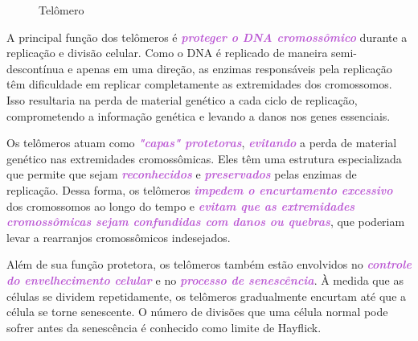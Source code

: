 \documentclass[11pt,a4paper]{article}
\begin{document}
    \begin{figure}[h]
        \centering
        \caption{Telômero}
        \label{fig:telomero}
    \end{figure}

    A principal função dos telômeros é \textcolor{MediumOrchid}{\textbf{\textit{proteger o DNA cromossômico}}} durante a replicação e divisão celular. Como o DNA é replicado de maneira semi-descontínua e apenas em uma direção, as enzimas responsáveis pela replicação têm dificuldade em replicar completamente as extremidades dos cromossomos. Isso resultaria na perda de material genético a cada ciclo de replicação, comprometendo a informação genética e levando a danos nos genes essenciais.

    Os telômeros atuam como \textcolor{MediumOrchid}{\textbf{\textit{"capas" protetoras}}}, \textcolor{MediumOrchid}{\textbf{\textit{evitando}}} a perda de material genético nas extremidades cromossômicas. Eles têm uma estrutura especializada que permite que sejam \textcolor{MediumOrchid}{\textbf{\textit{reconhecidos}}} e \textcolor{MediumOrchid}{\textbf{\textit{preservados}}} pelas enzimas de replicação. Dessa forma, os telômeros \textcolor{MediumOrchid}{\textbf{\textit{impedem o encurtamento excessivo}}} dos cromossomos ao longo do tempo e \textcolor{MediumOrchid}{\textbf{\textit{evitam que as extremidades cromossômicas sejam confundidas com danos ou quebras}}}, que poderiam levar a rearranjos cromossômicos indesejados.

    Além de sua função protetora, os telômeros também estão envolvidos no \textcolor{MediumOrchid}{\textbf{\textit{controle do envelhecimento celular}}} e no \textcolor{MediumOrchid}{\textbf{\textit{processo de senescência}}}. À medida que as células se dividem repetidamente, os telômeros gradualmente encurtam até que a célula se torne senescente. O número de divisões que uma célula normal pode sofrer antes da senescência é conhecido como limite de Hayflick.
\end{document}
